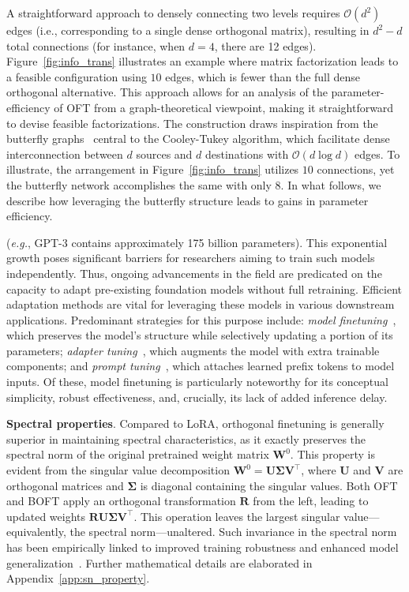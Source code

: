 A straightforward approach to densely connecting two levels requires $\mathcal{O}(d^2)$ edges (i.e., corresponding to a single dense orthogonal matrix), resulting in $d^2-d$ total connections (for instance, when $d=4$, there are 12 edges). Figure~\ref{fig:info_trans} illustrates an example where matrix factorization leads to a feasible configuration using $10$ edges, which is fewer than the full dense orthogonal alternative. This approach allows for an analysis of the parameter-efficiency of OFT from a graph-theoretical viewpoint, making it straightforward to devise feasible factorizations. The construction draws inspiration from the butterfly graphs~\cite{cooley1965algorithm} central to the Cooley-Tukey algorithm, which facilitate dense interconnection between $d$ sources and $d$ destinations with $\mathcal{O}(d\log d)$ edges. To illustrate, the arrangement in Figure~\ref{fig:info_trans} utilizes $10$ connections, yet the butterfly network accomplishes the same with only $8$. In what follows, we describe how leveraging the butterfly structure leads to gains in parameter efficiency.



(\emph{e.g.}, GPT-3 contains approximately 175 billion parameters). This exponential growth poses significant barriers for researchers aiming to train such models independently. Thus, ongoing advancements in the field are predicated on the capacity to adapt pre-existing foundation models without full retraining. Efficient adaptation methods are vital for leveraging these models in various downstream applications. Predominant strategies for this purpose include: \emph{model finetuning}~\cite{hulora2022,zaken2022bitfit,guo2020parameter,raffel2020exploring,qiu2023controlling,zhang2022adaptive,chavan2023one}, which preserves the model’s structure while selectively updating a portion of its parameters; \emph{adapter tuning}~\cite{rebuffi2017learning,houlsby2019parameter,pfeiffer2020adapterfusion,lin2020exploring,he2021towards}, which augments the model with extra trainable components; and \emph{prompt tuning}~\cite{li2021prefix,lester2021power}, which attaches learned prefix tokens to model inputs. Of these, model finetuning is particularly noteworthy for its conceptual simplicity, robust effectiveness, and, crucially, its lack of added inference delay.

\textbf{Spectral properties}. Compared to LoRA, orthogonal finetuning is generally superior in maintaining spectral characteristics, as it exactly preserves the spectral norm of the original pretrained weight matrix $\bm{W}^0$. This property is evident from the singular value decomposition $\bm{W}^0 = \bm{U} \bm{\Sigma} \bm{V}^\top$, where $\bm{U}$ and $\bm{V}$ are orthogonal matrices and $\bm{\Sigma}$ is diagonal containing the singular values. Both OFT and BOFT apply an orthogonal transformation $\bm{R}$ from the left, leading to updated weights $\bm{R}\bm{U}\bm{\Sigma}\bm{V}^\top$. This operation leaves the largest singular value—equivalently, the spectral norm—unaltered. Such invariance in the spectral norm has been empirically linked to improved training robustness and enhanced model generalization~\cite{miyato2018spectral,yoshida2017spectral}. Further mathematical details are elaborated in Appendix~\ref{app:sn_property}.

